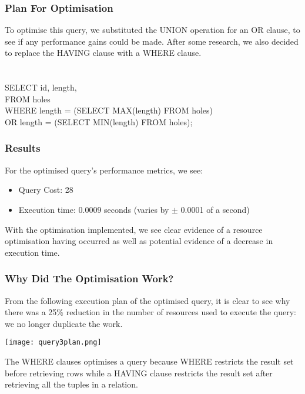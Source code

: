 \documentclass[titlepage]{article}
\begin{document}
\subsubsection{Plan For Optimisation}
\vspace{1em}
To optimise this query, we substituted the UNION operation for an OR clause, to see if any performance gains
could be made. After some research, we also decided to replace the HAVING clause with a WHERE clause. \\ \\ \\
\hspace{15pt}SELECT id, length, \\
\hspace{30pt}FROM holes \\
\hspace{30pt}WHERE length = (SELECT MAX(length) FROM holes) \\
\hspace{30pt}OR length = (SELECT MIN(length) FROM holes); \\
\subsubsection{Results}
For the optimised query's performance metrics, we see:
\begin{itemize}
  \item Query Cost: 28
  \item Execution time: 0.0009 seconds (varies by $\pm$ 0.0001 of a second)
\end{itemize}
\vspace{1em}
With the optimisation implemented, we see clear evidence of a resource optimisation having occurred as well
as potential evidence of a decrease in execution time. \\
\subsubsection{Why Did The Optimisation Work?}
From the following execution plan of the optimised query, it is clear to see why there was a 25\% reduction
in the number of resources used to execute the query: we no longer duplicate the work. \\
\begin{center}
\texttt{[image: query3plan.png]}
\end{center}
\noindent
The WHERE clauses optimises a query because WHERE restricts the result set before retrieving rows
while a HAVING clause restricts the result set after retrieving all the tuples in a relation. \\
\end{document}

